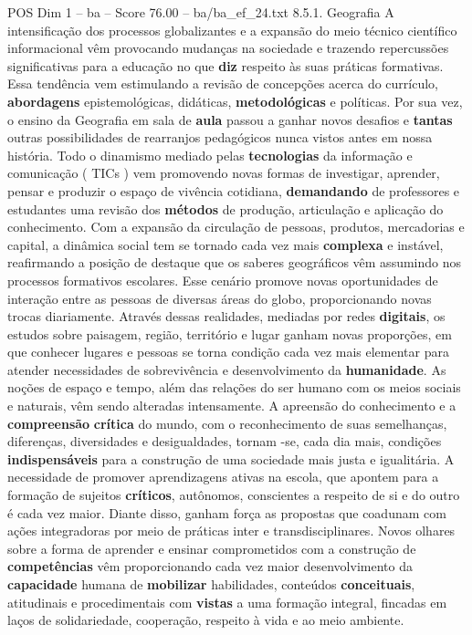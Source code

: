 \begin{textsample}{POS Dim 1 – ba – Score 76.00 – ba/ba\_ef\_24.txt}  \label{ex:f1_pos_101}
8.5.1.
Geografia A intensificação dos processos globalizantes e a expansão do meio técnico científico informacional vêm provocando mudanças na sociedade e trazendo repercussões significativas para a educação no que \textbf{diz} respeito às suas práticas formativas.
Essa tendência vem estimulando a revisão de concepções acerca do currículo, \textbf{abordagens} epistemológicas, didáticas, \textbf{metodológicas} e políticas.
Por sua vez, o ensino da Geografia em sala de \textbf{aula} passou a ganhar novos desafios e \textbf{tantas} outras possibilidades de rearranjos pedagógicos nunca vistos antes em nossa história.
Todo o dinamismo mediado pelas \textbf{tecnologias} da informação e comunicação ( TICs ) vem promovendo novas formas de investigar, aprender, pensar e produzir o espaço de vivência cotidiana, \textbf{demandando} de professores e estudantes uma revisão dos \textbf{métodos} de produção, articulação e aplicação do conhecimento.
Com a expansão da circulação de pessoas, produtos, mercadorias e capital, a dinâmica social tem se tornado cada vez mais \textbf{complexa} e instável, reafirmando a posição de destaque que os saberes geográficos vêm assumindo nos processos formativos escolares.
Esse cenário promove novas oportunidades de interação entre as pessoas de diversas áreas do globo, proporcionando novas trocas diariamente.
Através dessas realidades, mediadas por redes \textbf{digitais}, os estudos sobre paisagem, região, território e lugar ganham novas proporções, em que conhecer lugares e pessoas se torna condição cada vez mais elementar para atender necessidades de sobrevivência e desenvolvimento da \textbf{humanidade}.
As noções de espaço e tempo, além das relações do ser humano com os meios sociais e naturais, vêm sendo alteradas intensamente.
A apreensão do conhecimento e a \textbf{compreensão} \textbf{crítica} do mundo, com o reconhecimento de suas semelhanças, diferenças, diversidades e desigualdades, tornam -se, cada dia mais, condições \textbf{indispensáveis} para a construção de uma sociedade mais justa e igualitária.
A necessidade de promover aprendizagens ativas na escola, que apontem para a formação de sujeitos \textbf{críticos}, autônomos, conscientes a respeito de si e do outro é cada vez maior.
Diante disso, ganham força as propostas que coadunam com ações integradoras por meio de práticas inter e transdisciplinares.
Novos olhares sobre a forma de aprender e ensinar comprometidos com a construção de \textbf{competências} vêm proporcionando cada vez maior desenvolvimento da \textbf{capacidade} humana de \textbf{mobilizar} habilidades, conteúdos \textbf{conceituais}, atitudinais e procedimentais com \textbf{vistas} a uma formação integral, fincadas em laços de solidariedade, cooperação, respeito à vida e ao meio ambiente.

\end{textsample}
